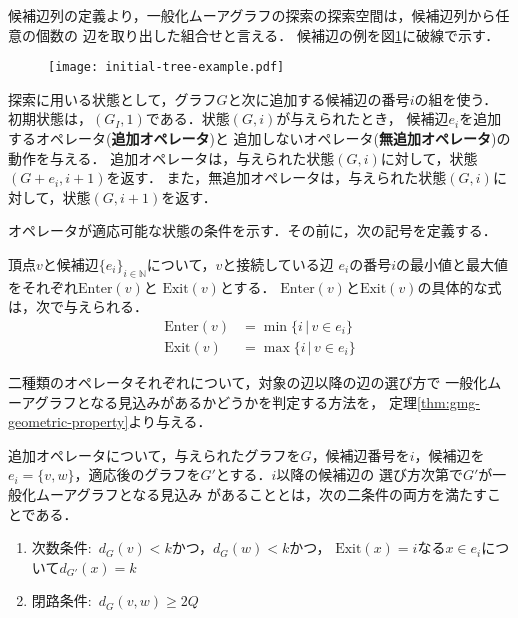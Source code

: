 候補辺列の定義より，一般化ムーアグラフの探索の探索空間は，候補辺列から任意の個数の
辺を取り出した組合せと言える．
候補辺の例を図\ref{fig:feasible-edges-example}に破線で示す．

\begin{figure}
  \centering
  \begin{minipage}{.45\columnwidth}
    \texttt{[image: initial-tree-example.pdf]}
    \label{fig:initial-tree-example}
  \end{minipage}
  \hfill
  \begin{minipage}{.45\columnwidth}
    \def\svgwidth{\textwidth}
    
    \label{fig:feasible-edges-example}
  \end{minipage}
\end{figure}

探索に用いる状態として，グラフ$G$と次に追加する候補辺の番号$i$の組を使う．
初期状態は，$(G_I,1)$である．状態$(G,i)$が与えられたとき，
候補辺$e_i$を追加するオペレータ(\textbf{追加オペレータ})と
追加しないオペレータ(\textbf{無追加オペレータ})の動作を与える．
追加オペレータは，与えられた状態$(G,i)$に対して，状態$(G+e_i,i+1)$を返す．
また，無追加オペレータは，与えられた状態$(G,i)$に対して，状態$(G,i+1)$を返す．

オペレータが適応可能な状態の条件を示す．その前に，次の記号を定義する．
\begin{definition}\rm
  頂点$v$と候補辺$\{e_i\}_{i\in\mathbb{N}}$について，$v$と接続している辺
  $e_i$の番号$i$の最小値と最大値をそれぞれ$\text{Enter}(v)$と
  $\text{Exit}(v)$とする．
  $\text{Enter}(v)$と$\text{Exit}(v)$の具体的な式は，次で与えられる．
  \begin{equation}
    \label{eq:frontier}
    \begin{aligned}
    \text{Enter}(v) &= \min\{i\,|\,v\in e_i\} \\
    \text{Exit}(v) &= \max\{i\,|\,v\in e_i\}
    \end{aligned}
  \end{equation}
\end{definition}

二種類のオペレータそれぞれについて，対象の辺以降の辺の選び方で
一般化ムーアグラフとなる見込みがあるかどうかを判定する方法を，
定理\ref{thm:gmg-geometric-property}より与える．

\begin{corollary-without-proof}\rm
  \label{coll:basic-add-operator}
  追加オペレータについて，与えられたグラフを$G$，候補辺番号を$i$，候補辺を
  $e_i=\{v,w\}$，適応後のグラフを$G'$とする．$i$以降の候補辺の
  選び方次第で$G'$が一般化ムーアグラフとなる見込み
  があることとは，次の二条件の両方を満たすことである．
  \begin{enumerate}
  \item 次数条件:\ $d_G(v)<k$かつ，$d_G(w)<k$かつ，
    $\text{Exit}(x)=i$なる$x\in e_i$について$d_{G'}(x)=k$
  \item 閉路条件:\ $d_G(v,w)\geq2Q$
  \end{enumerate}
\end{corollary-without-proof}

